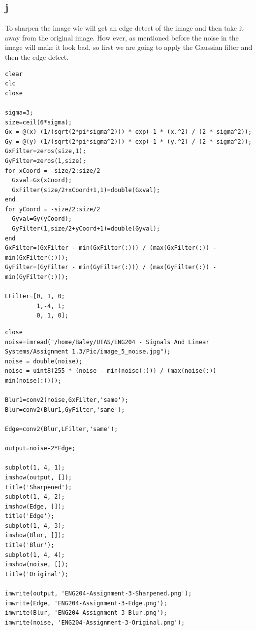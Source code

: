\documentclass[11pt]{article}
\begin{document}
\subsection{j}
\label{sec:org8dfb4fc}
To sharpen the image wie will get an edge detect of the image and then take it away from the original image. How ever, as mentioned before the noise in the image will make it look bad, so first we are going to apply the Gaussian filter and then the edge detect.
\begin{verbatim}
clear
clc
close

sigma=3;
size=ceil(6*sigma);
Gx = @(x) (1/(sqrt(2*pi*sigma^2))) * exp(-1 * (x.^2) / (2 * sigma^2));
Gy = @(y) (1/(sqrt(2*pi*sigma^2))) * exp(-1 * (y.^2) / (2 * sigma^2));
GxFilter=zeros(size,1);
GyFilter=zeros(1,size);
for xCoord = -size/2:size/2
  Gxval=Gx(xCoord);
  GxFilter(size/2+xCoord+1,1)=double(Gxval);
end
for yCoord = -size/2:size/2
  Gyval=Gy(yCoord);
  GyFilter(1,size/2+yCoord+1)=double(Gyval);
end
GxFilter=(GxFilter - min(GxFilter(:))) / (max(GxFilter(:)) - min(GxFilter(:)));
GyFilter=(GyFilter - min(GyFilter(:))) / (max(GyFilter(:)) - min(GyFilter(:)));

LFilter=[0, 1, 0;
         1,-4, 1;
         0, 1, 0];
\end{verbatim}


\begin{verbatim}
close
noise=imread("/home/Baley/UTAS/ENG204 - Signals And Linear Systems/Assignment 1.3/Pic/image_5_noise.jpg");
noise = double(noise);
noise = uint8(255 * (noise - min(noise(:))) / (max(noise(:)) - min(noise(:))));

Blur1=conv2(noise,GxFilter,'same');
Blur=conv2(Blur1,GyFilter,'same');

Edge=conv2(Blur,LFilter,'same');

output=noise-2*Edge;

subplot(1, 4, 1);
imshow(output, []);
title('Sharpened');
subplot(1, 4, 2);
imshow(Edge, []);
title('Edge');
subplot(1, 4, 3);
imshow(Blur, []);
title('Blur');
subplot(1, 4, 4);
imshow(noise, []);
title('Original');

imwrite(output, 'ENG204-Assignment-3-Sharpened.png');
imwrite(Edge, 'ENG204-Assignment-3-Edge.png');
imwrite(Blur, 'ENG204-Assignment-3-Blur.png');
imwrite(noise, 'ENG204-Assignment-3-Original.png');

\end{verbatim}
\end{document}
